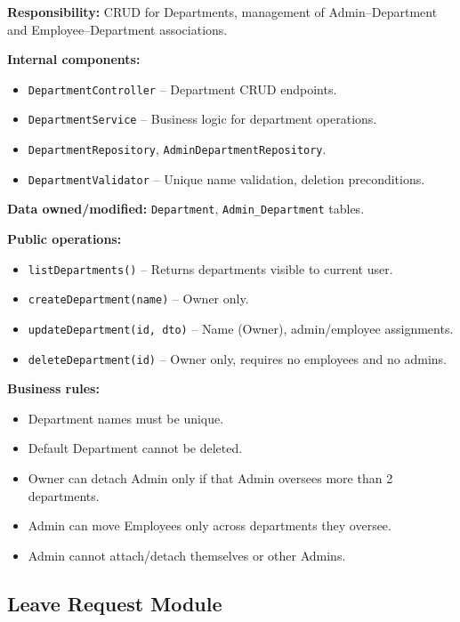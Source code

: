 \documentclass[11pt,a4paper]{article}
\begin{document}
\textbf{Responsibility:} CRUD for Departments, management of Admin--Department and Employee--Department associations.

\textbf{Internal components:}
\begin{itemize}[leftmargin=1.5em]
    \item \texttt{DepartmentController} -- Department CRUD endpoints.
    \item \texttt{DepartmentService} -- Business logic for department operations.
    \item \texttt{DepartmentRepository}, \texttt{AdminDepartmentRepository}.
    \item \texttt{DepartmentValidator} -- Unique name validation, deletion preconditions.
\end{itemize}

\textbf{Data owned/modified:} \texttt{Department}, \texttt{Admin\_Department} tables.

\textbf{Public operations:}
\begin{itemize}[leftmargin=1.5em]
    \item \texttt{listDepartments()} -- Returns departments visible to current user.
    \item \texttt{createDepartment(name)} -- Owner only.
    \item \texttt{updateDepartment(id, dto)} -- Name (Owner), admin/employee assignments.
    \item \texttt{deleteDepartment(id)} -- Owner only, requires no employees and no admins.
\end{itemize}

\textbf{Business rules:}
\begin{itemize}[leftmargin=1.5em]
    \item Department names must be unique.
    \item Default Department cannot be deleted.
    \item Owner can detach Admin only if that Admin oversees more than 2 departments.
    \item Admin can move Employees only across departments they oversee.
    \item Admin cannot attach/detach themselves or other Admins.
\end{itemize}

\subsection{Leave Request Module}
\end{document}
